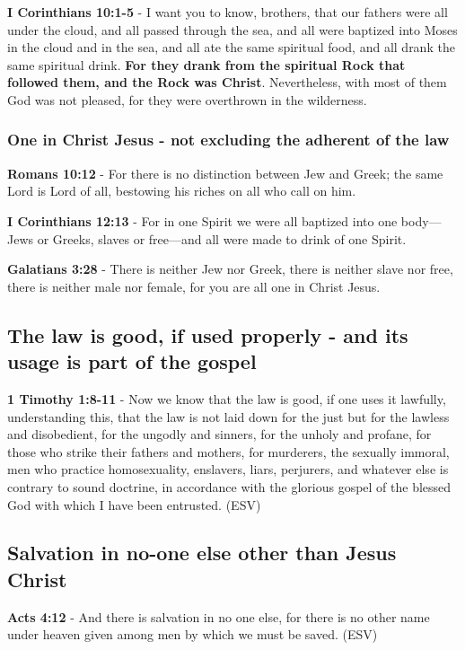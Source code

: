 \documentclass[11pt]{article}
\begin{document}
\textbf{I Corinthians 10:1-5} - I want you to know, brothers, that our fathers were all under the cloud, and all passed through the sea, and all were baptized into Moses in the cloud and in the sea, and all ate the same spiritual food, and all drank the same spiritual drink. \textbf{For they drank from the spiritual Rock that followed them, and the Rock was Christ}.  Nevertheless, with most of them God was not pleased, for they were overthrown in the wilderness.

\subsubsection{One in Christ Jesus - not excluding the adherent of the law}
\label{sec:org6246bcd}

\textbf{Romans 10:12} - For there is no distinction between Jew and Greek; the same Lord is Lord of all, bestowing his riches on all who call on him.

\textbf{I Corinthians 12:13} - For in one Spirit we were all baptized into one body—Jews or Greeks, slaves or free—and all were made to drink of one Spirit.

\textbf{Galatians 3:28} - There is neither Jew nor Greek, there is neither slave nor free, there is neither male nor female, for you are all one in Christ Jesus.

\subsection{The law is good, if used properly - and its usage is part of the gospel}
\label{sec:org3877b90}
\textbf{1 Timothy 1:8-11} -  Now we know that the law is good, if one uses it lawfully, understanding this, that the law is not laid down for the just but for the lawless and disobedient, for the ungodly and sinners, for the unholy and profane, for those who strike their fathers and mothers, for murderers, the sexually immoral, men who practice homosexuality, enslavers, liars, perjurers, and whatever else is contrary to sound doctrine, in accordance with the glorious gospel of the blessed God with which I have been entrusted.  (ESV)

\subsection{Salvation in no-one else other than Jesus Christ}
\label{sec:orgd125125}
\textbf{Acts 4:12} - And there is salvation in no one else, for there is no other name under heaven given among men by which we must be saved.  (ESV)
\end{document}
